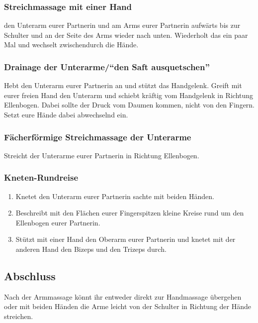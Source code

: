 \subsubsection{Streichmassage mit einer Hand}
 den Unterarm eurer Partnerin und  am Arms eurer Partnerin aufwärts bis zur Schulter und an der Seite des Arms wieder nach unten. Wiederholt das ein paar Mal und wechselt zwischendurch die Hände.

\subsubsection{Drainage der Unterarme/"`den Saft ausquetschen"'}
Hebt den Unterarm eurer Partnerin an und stützt das Handgelenk. Greift mit eurer freien Hand den Unterarm und schiebt kräftig vom Handgelenk in Richtung Ellenbogen. Dabei sollte der Druck vom Daumen kommen, nicht von den Fingern. Setzt eure Hände dabei abwechselnd ein.

\subsubsection{Fächerförmige Streichmassage der Unterarme}
Streicht  der Unterarme eurer Partnerin in Richtung Ellenbogen.

\subsubsection{Kneten-Rundreise}
\begin{oframed}
  \begin{enumerate}
    \item {} Knetet den Unterarm eurer Partnerin sachte mit beiden Händen.
    \item {} Beschreibt mit den Flächen eurer Fingerspitzen kleine Kreise rund um den Ellenbogen eurer Partnerin.
    \item {} Stützt mit einer Hand den Oberarm eurer Partnerin und knetet mit der anderen Hand den Bizeps und den Trizeps durch.
  \end{enumerate}
\end{oframed}

\subsection{Abschluss}
Nach der Armmassage könnt ihr entweder direkt zur Handmassage übergehen oder mit beiden Händen die Arme leicht von der Schulter in Richtung der Hände streichen.

